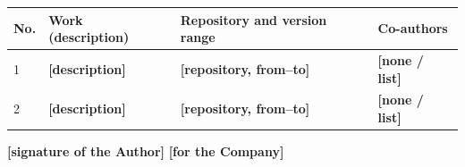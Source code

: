 \documentclass[12pt,a4paper]{report}
\newcommand{\field}[1]{\textbf{[#1]}}
\begin{document}
\begin{center}
\begin{tabularx}{\linewidth}{@{}p{0.75cm} >{\raggedright\arraybackslash}X >{\raggedright\arraybackslash}p{4.4cm} >{\raggedright\arraybackslash}p{3.0cm}@{}}
\toprule
\textbf{No.} & \textbf{Work (description)} & \textbf{Repository and version range} & \textbf{Co-authors} \\
\midrule
1 & \field{description} & \field{repository, from--to} & \field{none / list} \\
2 & \field{description} & \field{repository, from--to} & \field{none / list} \\
\bottomrule
\end{tabularx}
\end{center}

\field{signature of the Author} \hfill \field{for the Company}
\end{document}
